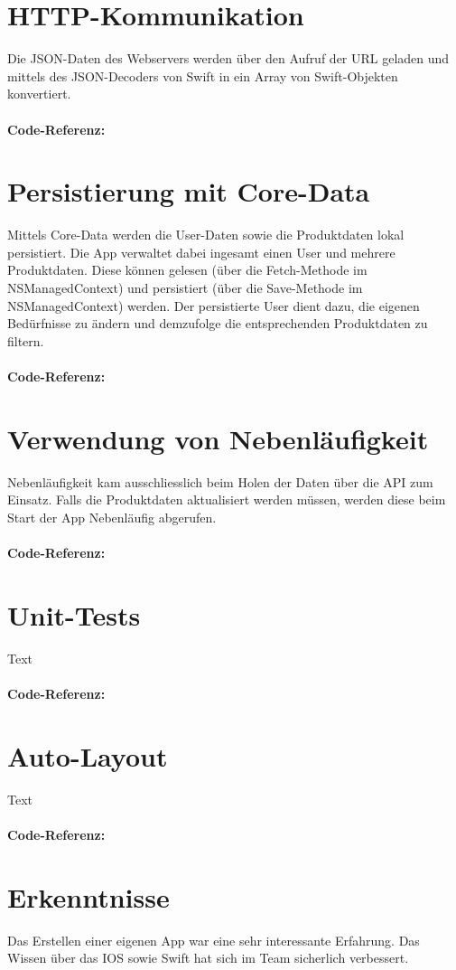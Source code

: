 \documentclass[12pt,titlepage]{article}
\begin{document}
\section*{HTTP-Kommunikation}
Die JSON-Daten des Webservers werden über den Aufruf der  URL geladen und mittels des JSON-Decoders von Swift in ein Array von Swift-Objekten konvertiert.\\
\\
\textbf{Code-Referenz: } 

\section*{Persistierung mit Core-Data}
Mittels Core-Data werden die User-Daten sowie die Produktdaten lokal persistiert. Die App verwaltet dabei ingesamt einen User und mehrere Produktdaten. Diese können gelesen (über die Fetch-Methode im NSManagedContext) und persistiert (über die Save-Methode im NSManagedContext) werden. Der persistierte User dient dazu, die eigenen Bedürfnisse zu ändern und demzufolge die entsprechenden Produktdaten zu filtern.\\
\\
\textbf{Code-Referenz: }


\section*{Verwendung von Nebenläufigkeit}
Nebenläufigkeit kam ausschliesslich beim Holen der Daten über die API zum Einsatz. Falls die Produktdaten aktualisiert werden müssen, werden diese beim Start der App Nebenläufig abgerufen.\\
\\
\textbf{Code-Referenz: }


\section*{Unit-Tests}
Text\\
\\
\textbf{Code-Referenz: }

\section*{Auto-Layout}
Text\\
\\
\textbf{Code-Referenz: }

\section*{Erkenntnisse}
Das Erstellen einer eigenen App war eine sehr interessante Erfahrung. Das Wissen über das IOS sowie Swift hat sich im Team sicherlich verbessert.
\end{document}
